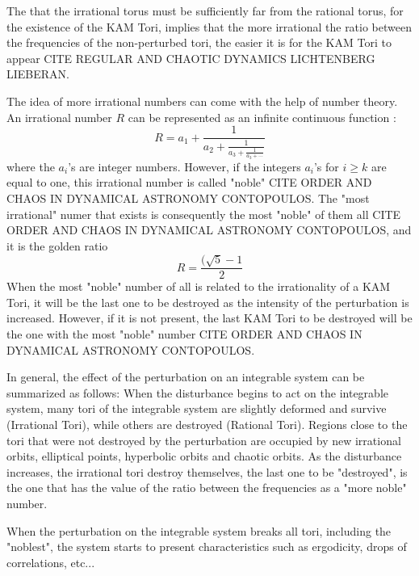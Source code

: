 The that the irrational torus must be sufficiently far from the rational torus, for the existence of the KAM Tori, implies that the more irrational the ratio between the frequencies of the non-perturbed tori, the easier it is for the KAM Tori to appear CITE REGULAR AND CHAOTIC DYNAMICS LICHTENBERG LIEBERAN.\par

The idea of more irrational numbers can come with the help of number theory. An irrational number $R$ can  be represented as an infinite continuous function \cite{ottChaosDynamicalSystems2002}:
\begin{equation}
R=a_1+\frac{1}{a_2+\frac{1}{a_3+\frac{1}{a_3+ \cdots}}}
\end{equation}
where the $a_i$'s are integer numbers. However, if the integers $a_i$'s for $i\geq k$ are equal to one, this irrational number is called "noble" CITE ORDER AND CHAOS IN DYNAMICAL ASTRONOMY CONTOPOULOS. The "most irrational" numer that exists is consequently the most "noble" of them all CITE ORDER AND CHAOS IN DYNAMICAL ASTRONOMY CONTOPOULOS, and it is the golden ratio
\begin{equation}
R=\frac{(\sqrt{5}-1}{2}
\end{equation}
When the most "noble" number of all is related to the irrationality of a KAM Tori, it will be the last one to be destroyed as the intensity of the perturbation is increased. However, if it is not present, the last KAM Tori to be destroyed will be the one with the most "noble" number CITE ORDER AND CHAOS IN DYNAMICAL ASTRONOMY CONTOPOULOS.\par

In general, the effect of the perturbation on an integrable system can be summarized as follows: When the disturbance begins to act on the integrable system, many tori of the integrable system are slightly deformed and survive (Irrational Tori), while others are destroyed (Rational Tori). Regions close to the tori that were not destroyed by the perturbation are occupied by new irrational orbits, elliptical points, hyperbolic orbits and chaotic orbits. As the disturbance increases, the irrational tori destroy themselves, the last one to be "destroyed", is the one that has the value of the ratio between the frequencies as a "more noble" number.\par

When the perturbation on the integrable system breaks all tori, including the "noblest", the system starts to present characteristics such as ergodicity, drops of correlations, etc...



